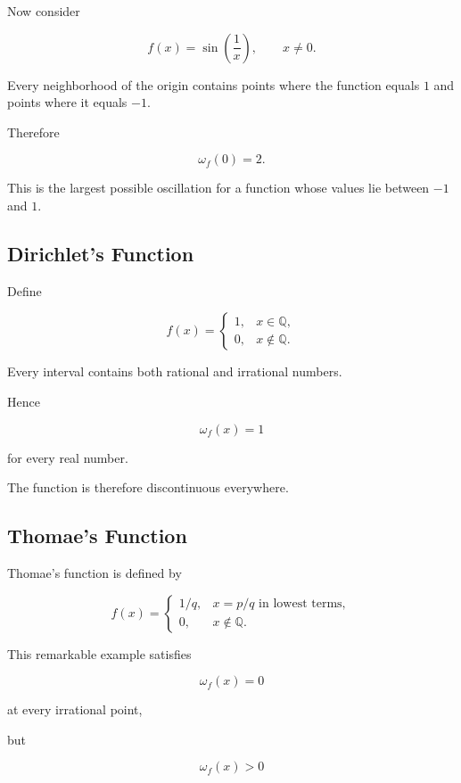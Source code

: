 \documentclass{essay}
\begin{document}
Now consider

\[ f(x) = \sin\left(\frac{1}{x}\right), \qquad x\neq0. \]

Every neighborhood of the origin contains points where the function equals
\(1\) and points where it equals \(-1\).

Therefore

\[ \omega_{f}(0)=2. \]

This is the largest possible oscillation for a function whose values lie between
\(-1\) and \(1\).


\subsection{Dirichlet's Function}

Define

\[
  f(x)=
  \begin{cases}
    1,&x\in\mathbb{Q},\\
    0,&x\notin\mathbb{Q}.
  \end{cases}
\]

Every interval contains both rational and irrational numbers.

Hence

\[ \omega_{f}(x)=1 \]

for every real number.

The function is therefore discontinuous everywhere.


\subsection{Thomae's Function}

Thomae's function is defined by

\[
  f(x)=
  \begin{cases}
    1/q,
    &
    x=p/q
    \text{ in lowest terms},\\
    0,
    &
    x\notin\mathbb{Q}.
  \end{cases}
\]

This remarkable example satisfies

\[ \omega_{f}(x)=0 \]

at every irrational point,

but

\[ \omega_{f}(x)>0 \]
\end{document}
